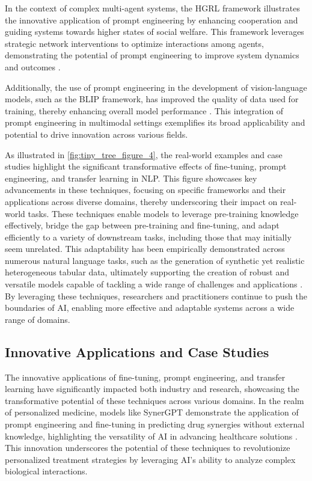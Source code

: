 In the context of complex multi-agent systems, the HGRL framework illustrates the innovative application of prompt engineering by enhancing cooperation and guiding systems towards higher states of social welfare. This framework leverages strategic network interventions to optimize interactions among agents, demonstrating the potential of prompt engineering to improve system dynamics and outcomes \cite{chen2024adaptivenetworkinterventioncomplex}.

Additionally, the use of prompt engineering in the development of vision-language models, such as the BLIP framework, has improved the quality of data used for training, thereby enhancing overall model performance \cite{BLIP:Boots3}. This integration of prompt engineering in multimodal settings exemplifies its broad applicability and potential to drive innovation across various fields.

As illustrated in \autoref{fig:tiny_tree_figure_4}, the real-world examples and case studies highlight the significant transformative effects of fine-tuning, prompt engineering, and transfer learning in NLP. This figure showcases key advancements in these techniques, focusing on specific frameworks and their applications across diverse domains, thereby underscoring their impact on real-world tasks. These techniques enable models to leverage pre-training knowledge effectively, bridge the gap between pre-training and fine-tuning, and adapt efficiently to a variety of downstream tasks, including those that may initially seem unrelated. This adaptability has been empirically demonstrated across numerous natural language tasks, such as the generation of synthetic yet realistic heterogeneous tabular data, ultimately supporting the creation of robust and versatile models capable of tackling a wide range of challenges and applications \cite{pihlgren2024systematicperformanceanalysisdeep,kasneci2023chatgpt,tang2023mvpmultitasksupervisedpretraining}. By leveraging these techniques, researchers and practitioners continue to push the boundaries of AI, enabling more effective and adaptable systems across a wide range of domains.


\subsection{Innovative Applications and Case Studies} \label{subsec:Innovative Applications and Case Studies}



The innovative applications of fine-tuning, prompt engineering, and transfer learning have significantly impacted both industry and research, showcasing the transformative potential of these techniques across various domains. In the realm of personalized medicine, models like SynerGPT demonstrate the application of prompt engineering and fine-tuning in predicting drug synergies without external knowledge, highlighting the versatility of AI in advancing healthcare solutions \cite{edwards2023synergptincontextlearningpersonalized}. This innovation underscores the potential of these techniques to revolutionize personalized treatment strategies by leveraging AI's ability to analyze complex biological interactions.



